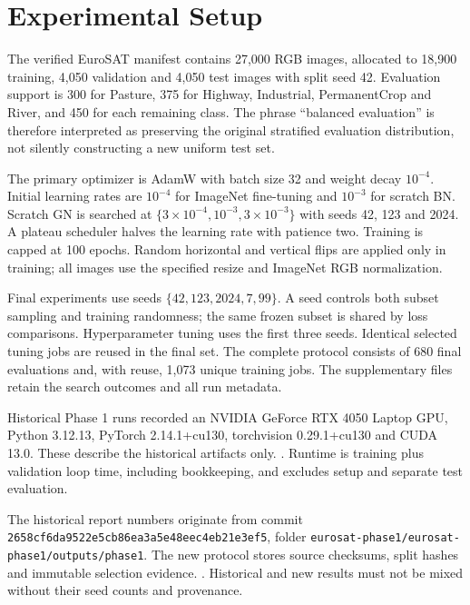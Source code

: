\section{Experimental Setup}
The verified EuroSAT manifest contains 27,000 RGB images, allocated to 18,900 training, 4,050 validation and 4,050 test images with split seed 42. Evaluation support is 300 for Pasture, 375 for Highway, Industrial, PermanentCrop and River, and 450 for each remaining class. The phrase ``balanced evaluation'' is therefore interpreted as preserving the original stratified evaluation distribution, not silently constructing a new uniform test set.

The primary optimizer is AdamW with batch size 32 and weight decay $10^{-4}$. Initial learning rates are $10^{-4}$ for ImageNet fine-tuning and $10^{-3}$ for scratch BN. Scratch GN is searched at $\{3\times10^{-4},10^{-3},3\times10^{-3}\}$ with seeds 42, 123 and 2024. A plateau scheduler halves the learning rate with patience two. Training is capped at 100 epochs. Random horizontal and vertical flips are applied only in training; all images use the specified resize and ImageNet RGB normalization.

Final experiments use seeds $\{42,123,2024,7,99\}$. A seed controls both subset sampling and training randomness; the same frozen subset is shared by loss comparisons. Hyperparameter tuning uses the first three seeds. Identical selected tuning jobs are reused in the final set. The complete protocol consists of 680 final evaluations and, with reuse, 1,073 unique training jobs. The supplementary files retain the search outcomes and all run metadata.

Historical Phase 1 runs recorded an NVIDIA GeForce RTX 4050 Laptop GPU, Python 3.12.13, PyTorch 2.14.1+cu130, torchvision 0.29.1+cu130 and CUDA 13.0. These describe the historical artifacts only. . Runtime is training plus validation loop time, including bookkeeping, and excludes setup and separate test evaluation.

The historical report numbers originate from commit
\nolinkurl{2658cf6da9522e5cb86ea3a5e48eec4eb21e3ef5}, folder
\nolinkurl{eurosat-phase1/eurosat-phase1/outputs/phase1}.
The new protocol stores source checksums, split hashes and immutable selection evidence. . Historical and new results must not be mixed without their seed counts and provenance.
